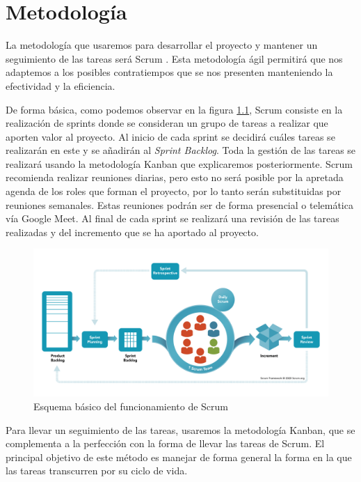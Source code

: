 \chapter{Metodología}
La metodología que usaremos para desarrollar el proyecto y mantener un seguimiento de las tareas será Scrum \cite {scrum}. Esta metodología ágil permitirá que nos adaptemos a los posibles contratiempos que se nos presenten manteniendo la efectividad y la eficiencia. 

De forma básica, como podemos observar en la figura \ref {fig:scrum_esquema}, Scrum consiste en la realización de sprints donde se consideran un grupo de tareas a realizar que aporten valor al proyecto. Al inicio de cada sprint se decidirá cuáles tareas se realizarán en este y se añadirán al \emph{Sprint Backlog}. Toda la gestión de las tareas se realizará usando la metodología Kanban que explicaremos posteriormente. Scrum recomienda realizar reuniones diarias, pero esto no será posible por la apretada agenda de los roles que forman el proyecto, por lo tanto serán substituidas por reuniones semanales. Estas reuniones podrán ser de forma presencial o telemática vía Google Meet. Al final de cada sprint se realizará una revisión de las tareas realizadas y del incremento que se ha aportado al proyecto.

\begin{figure}[h]
    \centering
    \includegraphics[width=1\textwidth]{img/scrum.png}
    \caption{Esquema básico del funcionamiento de Scrum \cite{scrum}}
    \label{fig:scrum_esquema}
\end{figure}

Para llevar un seguimiento de las tareas, usaremos la metodología Kanban, que se complementa a la perfección con la forma de llevar las tareas de Scrum. El principal objetivo de este método es manejar de forma general la forma en la que las tareas transcurren por su ciclo de vida. 

